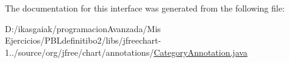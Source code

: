 The documentation for this interface was generated from the following file\+:\begin{DoxyCompactItemize}
\item 
D\+:/ikasgaiak/programacion\+Avanzada/\+Mis Ejercicios/\+P\+B\+Ldefinitibo2/libs/jfreechart-\/1../source/org/jfree/chart/annotations/\mbox{\hyperlink{_category_annotation_8java}{Category\+Annotation.\+java}}\end{DoxyCompactItemize}
